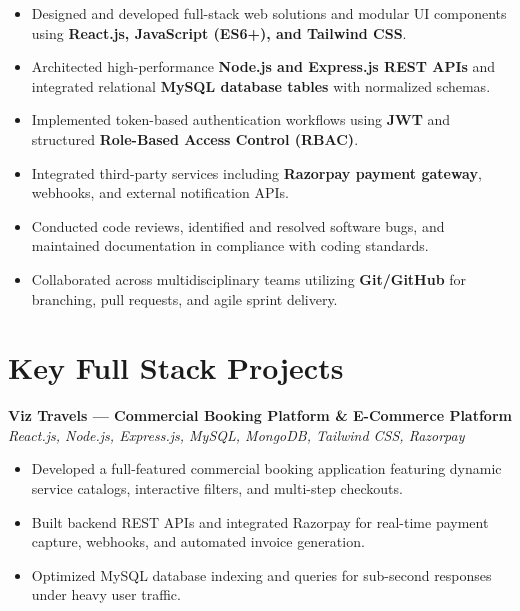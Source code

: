 \documentclass[a4paper,10pt]{article}
\begin{document}
\begin{itemize}

    \item Designed and developed full-stack web solutions and modular UI components using \textbf{React.js, JavaScript (ES6+), and Tailwind CSS}.

    \item Architected high-performance \textbf{Node.js and Express.js REST APIs} and integrated relational \textbf{MySQL database tables} with normalized schemas.

    \item Implemented token-based authentication workflows using \textbf{JWT} and structured \textbf{Role-Based Access Control (RBAC)}.

    \item Integrated third-party services including \textbf{Razorpay payment gateway}, webhooks, and external notification APIs.

    \item Conducted code reviews, identified and resolved software bugs, and maintained documentation in compliance with coding standards.

    \item Collaborated across multidisciplinary teams utilizing \textbf{Git/GitHub} for branching, pull requests, and agile sprint delivery.

\end{itemize}

\section*{Key Full Stack Projects}

\textbf{Viz Travels --- Commercial Booking Platform \& E-Commerce Platform}
\hfill
\textit{React.js, Node.js, Express.js, MySQL, MongoDB, Tailwind CSS, Razorpay}

\begin{itemize}

    \item Developed a full-featured commercial booking application featuring dynamic service catalogs, interactive filters, and multi-step checkouts.

    \item Built backend REST APIs and integrated Razorpay for real-time payment capture, webhooks, and automated invoice generation.

    \item Optimized MySQL database indexing and queries for sub-second responses under heavy user traffic.

\end{itemize}
\end{document}
